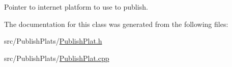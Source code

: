 Pointer to internet platform to use to publish. 



The documentation for this class was generated from the following files\+:\begin{DoxyCompactItemize}
\item 
src/\+Publish\+Plats/\hyperlink{_publish_plat_8h}{Publish\+Plat.\+h}\item 
src/\+Publish\+Plats/\hyperlink{_publish_plat_8cpp}{Publish\+Plat.\+cpp}\end{DoxyCompactItemize}

